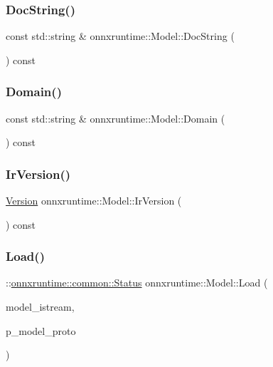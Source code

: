 \subsubsection{\texorpdfstring{Doc\+String()}{DocString()}}
{\footnotesize\ttfamily const std\+::string \& onnxruntime\+::\+Model\+::\+Doc\+String (\begin{DoxyParamCaption}{ }\end{DoxyParamCaption}) const}

\mbox{\label{classonnxruntime_1_1Model_a17ae7242244056337ed571f19b54f51a}} 
\subsubsection{\texorpdfstring{Domain()}{Domain()}}
{\footnotesize\ttfamily const std\+::string \& onnxruntime\+::\+Model\+::\+Domain (\begin{DoxyParamCaption}{ }\end{DoxyParamCaption}) const}

\mbox{\label{classonnxruntime_1_1Model_a6a7bb4216f04ffd4fec8b43129d304d4}} 
\subsubsection{\texorpdfstring{Ir\+Version()}{IrVersion()}}
{\footnotesize\ttfamily \mbox{\hyperlink{namespaceonnxruntime_ab7fae8d5830807c074def3bb8ae23cf1}{Version}} onnxruntime\+::\+Model\+::\+Ir\+Version (\begin{DoxyParamCaption}{ }\end{DoxyParamCaption}) const}

\mbox{\label{classonnxruntime_1_1Model_aee6c392788aa2baf2086f03032b21a3b}} 
\subsubsection{\texorpdfstring{Load()}{Load()}\hspace{0.1cm}{\footnotesize\ttfamily [1/5]}}
{\footnotesize\ttfamily \+::\mbox{\hyperlink{classonnxruntime_1_1common_1_1Status}{onnxruntime\+::common\+::\+Status}} onnxruntime\+::\+Model\+::\+Load (\begin{DoxyParamCaption}\item[{std\+::istream \&}]{model\+\_\+istream,  }\item[{O\+N\+N\+X\+\_\+\+N\+A\+M\+E\+S\+P\+A\+C\+E\+::\+Model\+Proto $\ast$}]{p\+\_\+model\+\_\+proto }\end{DoxyParamCaption})\hspace{0.3cm}{\ttfamily [static]}}

